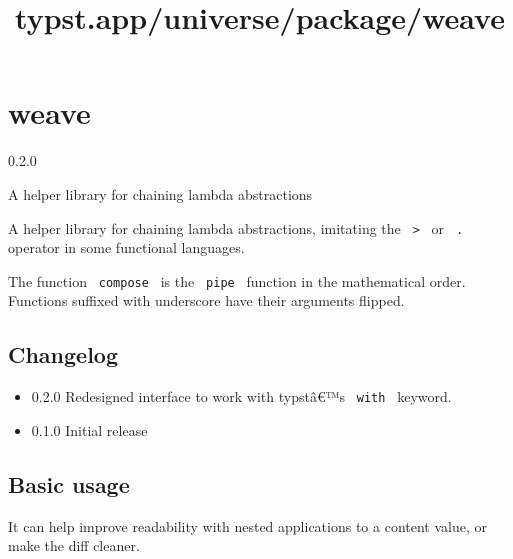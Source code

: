 \title{typst.app/universe/package/weave}

\label{banner}
\section{weave}\label{weave}

{ 0.2.0 }

A helper library for chaining lambda abstractions

\label{readme}
A helper library for chaining lambda abstractions, imitating the
\texttt{\ \textbar{}\textgreater{}\ } or \texttt{\ .\ } operator in some
functional languages.

The function \texttt{\ compose\ } is the \texttt{\ pipe\ } function in
the mathematical order. Functions suffixed with underscore have their
arguments flipped.

\subsection{Changelog}\label{changelog}

\begin{itemize}
\tightlist
\item
  0.2.0 Redesigned interface to work with typstâ€™s \texttt{\ with\ }
  keyword.
\item
  0.1.0 Initial release
\end{itemize}

\subsection{Basic usage}\label{basic-usage}

It can help improve readability with nested applications to a content
value, or make the diff cleaner.

\begin{Shaded}
\begin{Highlighting}[]
\NormalTok{      )}
\NormalTok{    )}
\NormalTok{  )}
\NormalTok{)}
\end{Highlighting}
\end{Shaded}

